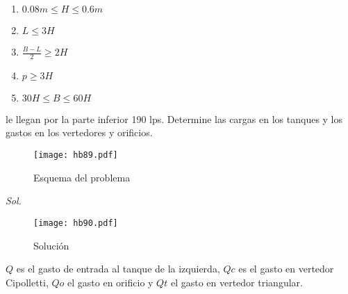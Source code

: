     \begin{enumerate}
        \item $0.08m\leq H\leq 0.6m$
        \item $L \leq 3H$
        \item $\frac{B-L}{2}\geq 2H$
        \item $p\geq 3H$
        \item $30H\leq B\leq 60H$
    \end{enumerate}

    \begin{problem}
        le llegan por la parte inferior 190 lps. Determine las cargas en los tanques y los gastos en los vertedores y orificios.
    \end{problem}
    \begin{figure}[h!]
    \centering
      \texttt{[image: hb89.pdf]}
      \caption{Esquema del problema}
      \label{hb89}
    \end{figure}
    
    \textit{ Sol. }
    
    \begin{figure}[h!]
    \centering
      \texttt{[image: hb90.pdf]}
      \caption{Solución}
      \label{hb90}
    \end{figure}
    
    $Q$ es el gasto de entrada al tanque de la izquierda, $Qc$ es el gasto en vertedor Cipolletti, $Qo$ el gasto en orificio y $Qt$ el gasto en vertedor triangular.
    
